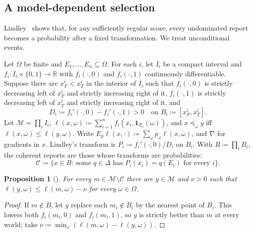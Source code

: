 \documentclass[11pt]{article}
\newenvironment{chgblockb}{\color{red}}{}
\newtheorem{proposition}[theorem]{Proposition}
\theoremstyle{definition}
\theoremstyle{remark}
\newcommand{\M}{\mathcal M}
\newcommand{\C}{\mathcal C}
\begin{document}
\begin{chgblockb}
\subsection{A model-dependent selection}\label{sec:lindley}

Lindley~\cite{Lindley1982} shows that, for any sufficiently regular score, every undominated report becomes a probability after a fixed transformation. We treat unconditional events.

Let $\Omega$ be finite and $E_1,\dots,E_n\subseteq\Omega$. For each $i$, let $I_i$ be a compact interval and $f_i\colon I_i\times\{0,1\}\to\mathbb R$ with $f_i(\cdot,0)$ and $f_i(\cdot,1)$ continuously differentiable. Suppose there are $x^i_F<x^i_T$ in the interior of $I_i$ such that $f_i(\cdot,0)$ is strictly decreasing left of $x^i_F$ and strictly increasing right of it, $f_i(\cdot,1)$ is strictly decreasing left of $x^i_T$ and strictly increasing right of it, and
\[
D_i\coloneqq f_i'(\cdot,0)-f_i'(\cdot,1)>0\quad\text{on }B_i\coloneqq[x^i_F,x^i_T].
\]
Let $\M=\prod_iI_i$, $\ell(x,\omega)\coloneqq\sum_{i=1}^nf_i(x_i,\mathbf 1_{E_i}(\omega))$, and $x\preceq_\omega y$ iff $\ell(x,\omega)\le\ell(y,\omega)$. Write $E_p\ell(x,\cdot)\coloneqq\sum_\omega p_\omega\ell(x,\omega)$, and $\nabla$ for gradients in $x$. Lindley's transform is $P_i\coloneqq f_i'(\cdot,0)/D_i$ on $B_i$. With $B\coloneqq\prod_iB_i$, the coherent reports are those whose transforms are probabilities:
\[
\C\coloneqq\{x\in B:\ \text{some }q\in\Delta\text{ has }P_i(x_i)=q(E_i)\text{ for every }i\}.
\]

\begin{proposition}[{\cite[Theorem~1]{Lindley1982}}]\label{prop:lindley}
For every $m\in\M\setminus\C$ there are $y\in\M$ and $\nu>0$ such that $\ell(y,\omega)\le\ell(m,\omega)-\nu$ for every $\omega\in\Omega$.
\end{proposition}
\begin{proof}
If $m\notin B$, let $y$ replace each $m_i\notin B_i$ by the nearest point of $B_i$. This lowers both $f_i(m_i,0)$ and $f_i(m_i,1)$, so $y$ is strictly better than $m$ at every world; take $\nu\coloneqq\min_\omega(\ell(m,\omega)-\ell(y,\omega))$.


\end{proof}
\end{chgblockb}
\end{document}
